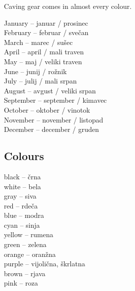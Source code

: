 \begin{marginfigure}
\checkoddpage \ifoddpage \forcerectofloat \else \forceversofloat \fi
\centering
 \caption{Caving gear comes in almost every colour. }
 \label{colourful gear}
\end{marginfigure}

January -- januar / prosinec\\
February -- februar / svečan\\
March -- marec / sušec\\
April -- april / mali traven\\
May -- maj / veliki traven\\
June -- junij / rožnik\\
July -- julij / mali srpan\\
August -- avgust / veliki srpan\\
September -- september / kimavec\\
October -- oktober / vinotok\\
November -- november / listopad\\
December -- december / gruden\\

\subsection{Colours}

black -- črna\\
white -- bela\\
gray -- siva\\
red -- rdeča\\
blue -- modra\\
cyan -- sinja\\
yellow -- rumena\\
green -- zelena\\
orange -- oranžna\\
purple -- vijolična, škrlatna\\
brown -- rjava\\
pink -- roza\\

